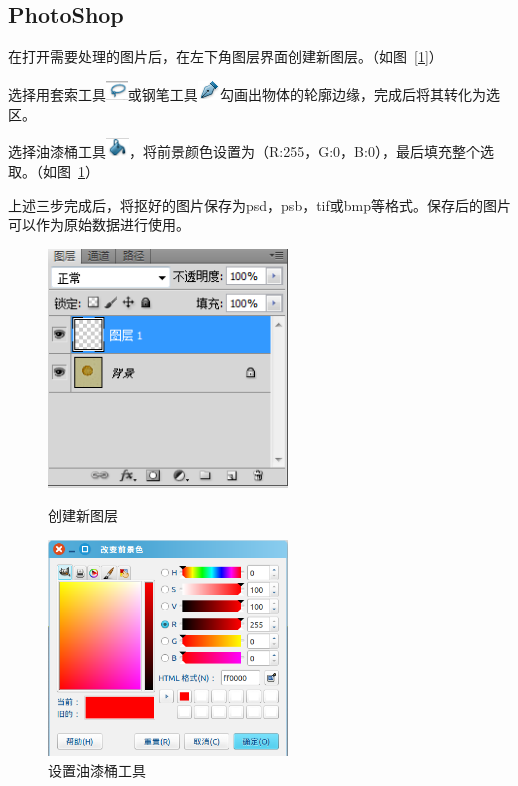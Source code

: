 \documentclass[12pt]{article}
\begin{document}
\subsection*{PhotoShop}
\begin{enumerate*}
\item 在打开需要处理的图片后，在左下角图层界面创建新图层。（如图~\ref{1}）
\item 选择用套索工具\includegraphics[height=0.2in]{taosuo.png}或钢笔工具\includegraphics[height=0.2in]{gangbi.png}勾画出物体的轮廓边缘，完成后将其转化为选区。


\item 选择油漆桶工具\includegraphics[height=0.2in]{youqitong2.png}，将前景颜色设置为（R:255，G:0，B:0），最后填充整个选取。（如图~\ref{2}）
\item 上述三步完成后，将抠好的图片保存为psd，psb，tif或bmp等格式。保存后的图片可以作为原始数据进行使用。
\end{enumerate*}

\begin{figure}[htbp]
\begin{minipage}{0.5\textwidth}
\centering
\includegraphics[width=2.5in]{xinjiantuceng.png}
\caption{创建新图层}
\label{1}
\end{minipage}
\begin{minipage}{0.5\textwidth}
\centering
\includegraphics[width=2.5in]{qianjing.png}
\caption{设置油漆桶工具}
\label{2}
\end{minipage}
\end{figure}
\end{document}
